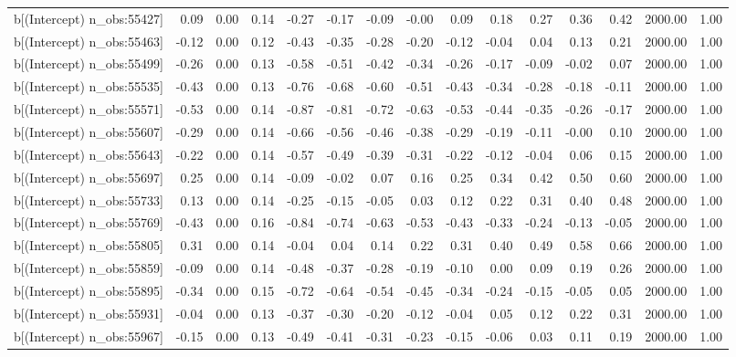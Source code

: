 \begin{table}[ht]
\begin{tabular}{rrrrrrrrrrrrrrr}
  b[(Intercept) n\_obs:55427] & 0.09 & 0.00 & 0.14 & -0.27 & -0.17 & -0.09 & -0.00 & 0.09 & 0.18 & 0.27 & 0.36 & 0.42 & 2000.00 & 1.00 \\ 
  b[(Intercept) n\_obs:55463] & -0.12 & 0.00 & 0.12 & -0.43 & -0.35 & -0.28 & -0.20 & -0.12 & -0.04 & 0.04 & 0.13 & 0.21 & 2000.00 & 1.00 \\ 
  b[(Intercept) n\_obs:55499] & -0.26 & 0.00 & 0.13 & -0.58 & -0.51 & -0.42 & -0.34 & -0.26 & -0.17 & -0.09 & -0.02 & 0.07 & 2000.00 & 1.00 \\ 
  b[(Intercept) n\_obs:55535] & -0.43 & 0.00 & 0.13 & -0.76 & -0.68 & -0.60 & -0.51 & -0.43 & -0.34 & -0.28 & -0.18 & -0.11 & 2000.00 & 1.00 \\ 
  b[(Intercept) n\_obs:55571] & -0.53 & 0.00 & 0.14 & -0.87 & -0.81 & -0.72 & -0.63 & -0.53 & -0.44 & -0.35 & -0.26 & -0.17 & 2000.00 & 1.00 \\ 
  b[(Intercept) n\_obs:55607] & -0.29 & 0.00 & 0.14 & -0.66 & -0.56 & -0.46 & -0.38 & -0.29 & -0.19 & -0.11 & -0.00 & 0.10 & 2000.00 & 1.00 \\ 
  b[(Intercept) n\_obs:55643] & -0.22 & 0.00 & 0.14 & -0.57 & -0.49 & -0.39 & -0.31 & -0.22 & -0.12 & -0.04 & 0.06 & 0.15 & 2000.00 & 1.00 \\ 
  b[(Intercept) n\_obs:55697] & 0.25 & 0.00 & 0.14 & -0.09 & -0.02 & 0.07 & 0.16 & 0.25 & 0.34 & 0.42 & 0.50 & 0.60 & 2000.00 & 1.00 \\ 
  b[(Intercept) n\_obs:55733] & 0.13 & 0.00 & 0.14 & -0.25 & -0.15 & -0.05 & 0.03 & 0.12 & 0.22 & 0.31 & 0.40 & 0.48 & 2000.00 & 1.00 \\ 
  b[(Intercept) n\_obs:55769] & -0.43 & 0.00 & 0.16 & -0.84 & -0.74 & -0.63 & -0.53 & -0.43 & -0.33 & -0.24 & -0.13 & -0.05 & 2000.00 & 1.00 \\ 
  b[(Intercept) n\_obs:55805] & 0.31 & 0.00 & 0.14 & -0.04 & 0.04 & 0.14 & 0.22 & 0.31 & 0.40 & 0.49 & 0.58 & 0.66 & 2000.00 & 1.00 \\ 
  b[(Intercept) n\_obs:55859] & -0.09 & 0.00 & 0.14 & -0.48 & -0.37 & -0.28 & -0.19 & -0.10 & 0.00 & 0.09 & 0.19 & 0.26 & 2000.00 & 1.00 \\ 
  b[(Intercept) n\_obs:55895] & -0.34 & 0.00 & 0.15 & -0.72 & -0.64 & -0.54 & -0.45 & -0.34 & -0.24 & -0.15 & -0.05 & 0.05 & 2000.00 & 1.00 \\ 
  b[(Intercept) n\_obs:55931] & -0.04 & 0.00 & 0.13 & -0.37 & -0.30 & -0.20 & -0.12 & -0.04 & 0.05 & 0.12 & 0.22 & 0.31 & 2000.00 & 1.00 \\ 
  b[(Intercept) n\_obs:55967] & -0.15 & 0.00 & 0.13 & -0.49 & -0.41 & -0.31 & -0.23 & -0.15 & -0.06 & 0.03 & 0.11 & 0.19 & 2000.00 & 1.00 \\ 

\end{tabular}
\end{table}
